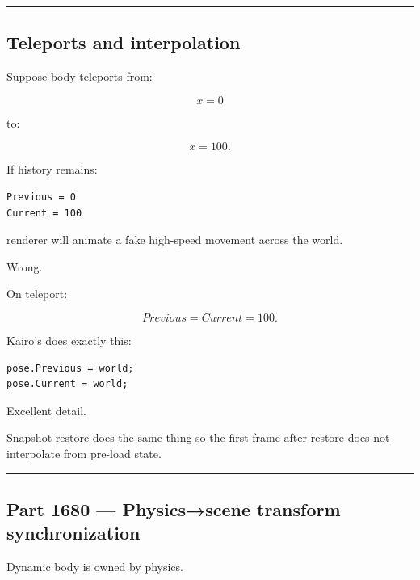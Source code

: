 \begin{center}\rule{0.5\linewidth}{0.5pt}\end{center}

\subsection{Teleports and interpolation}\label{06-engine-ii-ch037-teleports-and-interpolation}

\hypertarget{06-engine-ii-ch037-teleports-and-interpolation}{}

Suppose body teleports from:

\[
x=0
\]

to:

\[
x=100.
\]

If history remains:

\begin{verbatim}
Previous = 0
Current = 100
\end{verbatim}

renderer will animate a fake high-speed movement across the world.

Wrong.

On teleport:

\[
Previous=Current=100.
\]

Kairo's  does exactly this:

\begin{verbatim}
pose.Previous = world;
pose.Current = world;
\end{verbatim}

Excellent detail.

Snapshot restore does the same thing so the first frame after restore does not interpolate from pre-load state.

\begin{center}\rule{0.5\linewidth}{0.5pt}\end{center}

\subsection{Part 1680 --- Physics→scene transform synchronization}\label{06-engine-ii-ch037-part-1680-physicsscene-transform-synchronization}

\hypertarget{06-engine-ii-ch037-part-1680-physicsscene-transform-synchronization}{}

Dynamic body is owned by physics.


